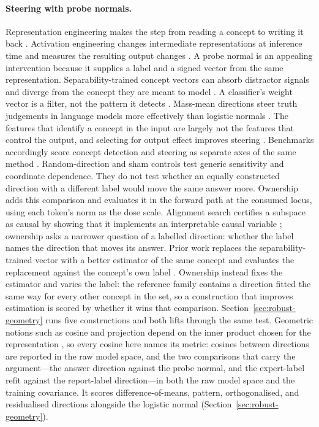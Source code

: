\paragraph{Steering with probe normals.}
Representation engineering makes the step from reading a concept to writing it back \citep{zou2023representation}. Activation engineering changes intermediate representations at inference time and measures the resulting output changes \citep{turner2023steering,panickssery2024caa}. A probe normal is an appealing intervention because it supplies a label and a signed vector from the same representation. Separability-trained concept vectors can absorb distractor signals and diverge from the concept they are meant to model \citep{pahde2025navigating}. A classifier's weight vector is a filter, not the pattern it detects \citep{haufe2014interpretation}. Mass-mean directions steer truth judgements in language models more effectively than logistic normals \citep{marks2024geometry}. The features that identify a concept in the input are largely not the features that control the output, and selecting for output effect improves steering \citep{arad2025saes}. Benchmarks accordingly score concept detection and steering as separate axes of the same method \citep{wu2025axbench}. Random-direction and sham controls test generic sensitivity and coordinate dependence. They do not test whether an equally constructed direction with a different label would move the same answer more. Ownership adds this comparison and evaluates it in the forward path at the consumed locus, using each token's norm as the dose scale. Alignment search certifies a subspace as causal by showing that it implements an interpretable causal variable \citep{geiger2024alignments}; ownership asks a narrower question of a labelled direction: whether the label names the direction that moves its answer. Prior work replaces the separability-trained vector with a better estimator of the same concept and evaluates the replacement against the concept's own label \citep{pahde2025navigating,haufe2014interpretation,marks2024geometry}. Ownership instead fixes the estimator and varies the label: the reference family contains a direction fitted the same way for every other concept in the set, so a construction that improves estimation is scored by whether it wins that comparison. Section~\ref{sec:robust-geometry} runs five constructions and both lifts through the same test. Geometric notions such as cosine and projection depend on the inner product chosen for the representation \citep{park2024linear}, so every cosine here names its metric: cosines between directions are reported in the raw model space, and the two comparisons that carry the argument---the answer direction against the probe normal, and the expert-label refit against the report-label direction---in both the raw model space and the training covariance. It scores difference-of-means, pattern, orthogonalised, and residualised directions alongside the logistic normal (Section~\ref{sec:robust-geometry}).


